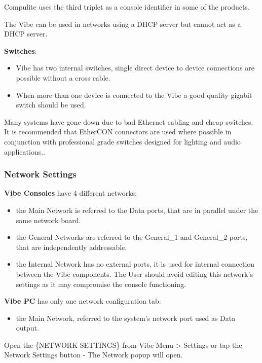 \documentclass[
]{article}
\providecommand{\tightlist}{%
  \setlength{\itemsep}{0pt}\setlength{\parskip}{0pt}}
\begin{document}
Compulite uses the third triplet as a console identifier in some of the products.

The Vibe can be used in networks using a DHCP server but cannot act as a DHCP server.

\textbf{Switches}:

\begin{itemize}
\item
  Vibe has two internal switches, single direct device to device connections are possible without a cross cable.
\item
  When more than one device is connected to the Vibe a good quality gigabit switch should be used.
\end{itemize}

{Many systems have gone down due to bad Ethernet cabling and cheap switches. It is recommended that EtherCON connectors are used where possible in conjunction with professional grade switches designed for lighting and audio applications.}.

\hypertarget{network-settings}{%
\subsubsection{Network Settings}\label{network-settings}}

\textbf{Vibe Consoles} have 4 different networks:

\begin{itemize}
\item
  the Main Network is referred to the Data ports, that are in parallel under the same network board.
\item
  the General Networks are referred to the General\_1 and General\_2 ports, that are independently addressable.
\item
  the Internal Network has no external ports, it is used for internal connection between the Vibe components. The User should avoid editing this network's settings as it may compromise the console functioning.
\end{itemize}

\textbf{Vibe PC} has only one network configuration tab:

\begin{itemize}
\tightlist
\item
  the Main Network, referred to the system's network port used as Data output.
\end{itemize}

Open the \{NETWORK SETTINGS\} from Vibe Menu \textgreater{} Settings or tap the Network Settings button - The Network popup will open.
\end{document}
